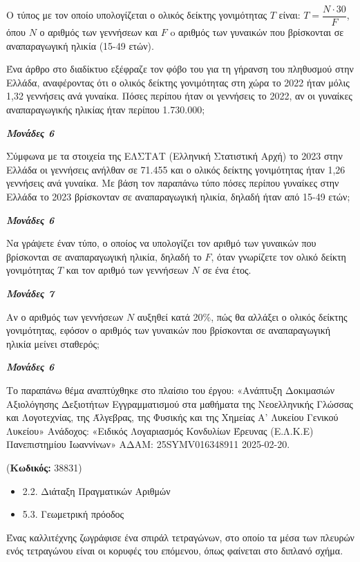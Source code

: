 \documentclass[11pt,a4paper,twoside]{book}
\newcounter{askhsh}[chapter]
\renewcommand{\theaskhsh}{
	\bf{\titlefont{\Large{\thechapter}}.\arabic{askhsh}}
}
\newcommand{\Askhsh}[2]{\refstepcounter{askhsh}{\titlefont{Άσκηση\theaskhsh} - \textcolor{maincolor}{ΘΕΜΑ #2}} ({\small{\textbf{Κωδικός:} #1}})\\}{}
\newenvironment{ylh}{
\begin{tcolorbox}[
breakable,
enhanced standard,
titlerule=0pt,
toprule=0pt, 
rightrule=0pt, 
bottomrule=0pt,
title={\titlefont Ύλη άσκησης},
colback=white,
opacityback=0,
left=2mm,
top=1mm,
bottom=0mm,
boxrule=0pt,
colframe=white,
borderline west={1.5mm}{0pt}{secondarycolor},
leftrule=2mm,
sharp corners,
coltitle=black
]
\begin{itemize}[leftmargin=3mm, itemsep=0mm, label=\textcolor{secondarycolor}{{\small\faBook}}]
}{
\end{itemize}
\end{tcolorbox}
}
\newcommand{\monades}[1]{
\hspace*{\fill}
\textbf{\textit{\textcolor{maincolor}{Μονάδες #1}}}}
\begin{document}
Ο τύπος με τον οποίο υπολογίζεται ο ολικός δείκτης γονιμότητας $T$ είναι: $T = \dfrac{Ν \cdot 30}{F}$, όπου $N$ ο αριθμός των γεννήσεων και $F$ o αριθμός των γυναικών που βρίσκονται σε αναπαραγωγική ηλικία (15-49 ετών).

\begin{alist}
\item Ένα άρθρο στο διαδίκτυο εξέφραζε τον φόβο του για τη γήρανση του πληθυσμού στην Ελλάδα, αναφέροντας ότι ο ολικός δείκτης γονιμότητας στη χώρα το 2022 ήταν μόλις 1,32 γεννήσεις ανά γυναίκα. Πόσες περίπου ήταν οι γεννήσεις το 2022, αν οι γυναίκες αναπαραγωγικής ηλικίας ήταν περίπου 1.730.000;
\monades{6}
\item Σύμφωνα με τα στοιχεία της ΕΛΣΤΑΤ (Ελληνική Στατιστική Αρχή) το 2023 στην Ελλάδα οι γεννήσεις ανήλθαν σε 71.455 και ο ολικός δείκτης γονιμότητας ήταν 1,26 γεννήσεις ανά γυναίκα. Με βάση τον παραπάνω τύπο πόσες περίπου γυναίκες στην Ελλάδα το 2023 βρίσκονταν σε αναπαραγωγική ηλικία, δηλαδή ήταν από 15-49 ετών;
\monades{6}
\item Να γράψετε έναν τύπο, ο οποίος να υπολογίζει τον αριθμό των γυναικών που βρίσκονται σε αναπαραγωγική ηλικία, δηλαδή το $F$, όταν γνωρίζετε τον ολικό δείκτη γονιμότητας $T$ και τον αριθμό των γεννήσεων $N$ σε ένα έτος.
\monades{7}
\item Αν ο αριθμός των γεννήσεων $N$ αυξηθεί κατά 20\%, πώς θα αλλάξει ο ολικός δείκτης γονιμότητας, εφόσον ο αριθμός των γυναικών που βρίσκονται σε αναπαραγωγική ηλικία μείνει σταθερός;
\monades{6}

{\footnotesize Το παραπάνω θέμα αναπτύχθηκε στο πλαίσιο του έργου: «Ανάπτυξη Δοκιμασιών Αξιολόγησης Δεξιοτήτων Εγγραμματισμού στα μαθήματα της Νεοελληνικής Γλώσσας και Λογοτεχνίας, της Άλγεβρας, της Φυσικής και της Χημείας Α' Λυκείου Γενικού Λυκείου» Ανάδοχος: «Ειδικός Λογαριασμός Κονδυλίων Έρευνας (Ε.Λ.Κ.Ε) Πανεπιστημίου Ιωαννίνων» ΑΔΑΜ: 25SYMV016348911 2025-02-20.}
\end{alist}

\vspace{4mm}
\Askhsh{38831}{4}
\begin{ylh}
    \item 2.2. Διάταξη Πραγματικών Αριθμών
    \item 5.3. Γεωμετρική πρόοδος
\end{ylh}

Ένας καλλιτέχνης ζωγράφισε ένα σπιράλ τετραγώνων, στο οποίο τα μέσα των πλευρών ενός τετραγώνου είναι οι κορυφές του επόμενου, όπως φαίνεται στο διπλανό σχήμα.
\end{document}
